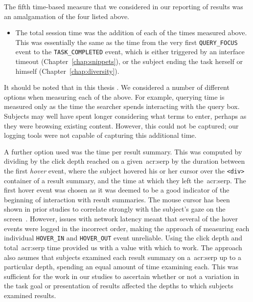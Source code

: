 The fifth time-based measure that we considered in our reporting of results was an amalgamation of the four listed above.

\begin{itemize}
    \item{ The total session time was the addition of each of the times measured above. This was essentially the same as the time from the very first \texttt{QUERY\_FOCUS} event to the \texttt{TASK\_COMPLETED} event, which is either triggered by an interface timeout (Chapter~\ref{chap:snippets}), or the subject ending the task herself or himself (Chapter~\ref{chap:diversity}).}
    
\end{itemize}

It should be noted that in this thesis . We considered a number of different options when measuring each of the above. For example, querying time is measured only as the time the searcher spends interacting with the query box. Subjects may well have spent longer considering what terms to enter, perhaps as they were browsing existing content. However, this could not be captured; our logging tools were not capable of capturing this additional time.

A further option used was the time per result summary. This was computed by dividing by the click depth reached on a given~\gls{acr:serp} by the duration between the first \emph{hover} event, where the subject hovered his or her cursor over the \texttt{<div>} container of a result summary, and the time at which they left the~\gls{acr:serp}. The first hover event was chosen as it was deemed to be a good indicator of the beginning of interaction with result summaries. The mouse cursor has been shown in prior studies to correlate strongly with the subject's gaze on the screen~\citep{chen2001mouse_cursor, smucker2014judging_relevance_movements}. However, issues with network latency meant that several of the hover events were logged in the incorrect order, making the approach of measuring each individual \texttt{HOVER\_IN} and \texttt{HOVER\_OUT} event unreliable. Using the click depth and total~\gls{acr:serp} time provided us with a value with which to work. The approach also asumes that subjects examined each result summary on a~\gls{acr:serp} up to a particular depth, spending an equal amount of time examining each. This was sufficient for the work in our studies to ascertain whether or not a variation in the task goal or presentation of results affected the depths to which subjects examined results.

